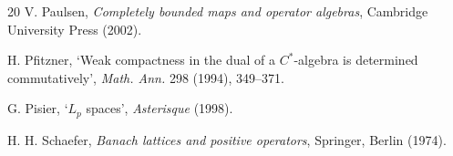 \documentclass[12pt]{amsart}
\theoremstyle{plain}
\theoremstyle{definition}
\begin{document}
\begin{thebibliography}{20}
 V. Paulsen,
{\em Completely bounded maps and operator algebras},
Cambridge University Press (2002).


 H. Pfitzner,
`Weak compactness in the dual of a $C^*$-algebra is determined commutatively',
{\em Math. Ann.} 298 (1994), 349--371.



 G. Pisier,
`$L_p$ spaces', {\em Asterisque} (1998).








 H. H. Schaefer,
{\em Banach lattices and positive operators},
Springer, Berlin (1974).


\end{thebibliography}
\end{document}
